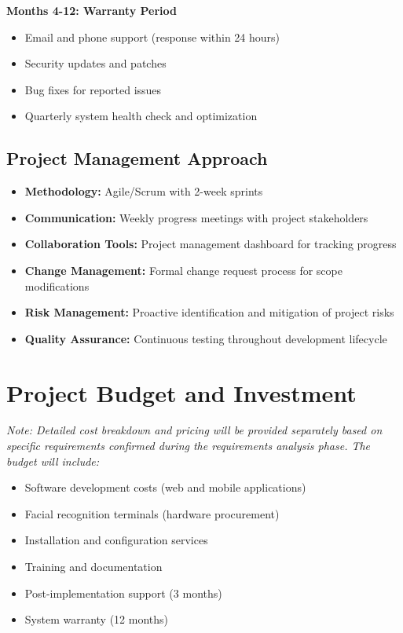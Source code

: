 \documentclass[12pt]{article}
\begin{document}
\textbf{Months 4-12: Warranty Period}
\begin{itemize}[noitemsep]
\item Email and phone support (response within 24 hours)
\item Security updates and patches
\item Bug fixes for reported issues
\item Quarterly system health check and optimization
\end{itemize}

\subsection{Project Management Approach}

\begin{itemize}[noitemsep]
\item \textbf{Methodology:} Agile/Scrum with 2-week sprints
\item \textbf{Communication:} Weekly progress meetings with project stakeholders
\item \textbf{Collaboration Tools:} Project management dashboard for tracking progress
\item \textbf{Change Management:} Formal change request process for scope modifications
\item \textbf{Risk Management:} Proactive identification and mitigation of project risks
\item \textbf{Quality Assurance:} Continuous testing throughout development lifecycle
\end{itemize}

\section{Project Budget and Investment}

\textit{Note: Detailed cost breakdown and pricing will be provided separately based on specific requirements confirmed during the requirements analysis phase. The budget will include:}

\begin{itemize}[noitemsep]
\item Software development costs (web and mobile applications)
\item Facial recognition terminals (hardware procurement)
\item Installation and configuration services
\item Training and documentation
\item Post-implementation support (3 months)
\item System warranty (12 months)
\end{itemize}
\end{document}
